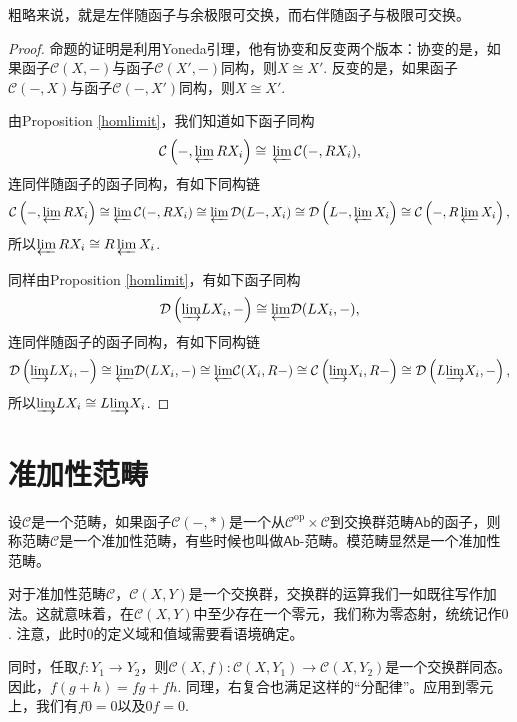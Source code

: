 	粗略来说，就是左伴随函子与余极限可交换，而右伴随函子与极限可交换。
	
\begin{proof}
	命题的证明是利用Yoneda引理，他有协变和反变两个版本：协变的是，如果函子$\mathcal{C}(X,-)$与函子$\mathcal{C}(X',-)$同构，则$X\cong X'$. 反变的是，如果函子$\mathcal{C}(-,X)$与函子$\mathcal{C}(-,X')$同构，则$X\cong X'$.
	
	由Proposition \ref{homlimit}，我们知道如下函子同构
	\[
	\mathcal{C}\left(-,{\varprojlim}\, RX_i\right)\cong \,{\varprojlim}\, \mathcal{C}(-,RX_i),
	\]
	连同伴随函子的函子同构，有如下同构链
	\[
	\mathcal{C}\left(-,{\varprojlim}\, RX_i\right)\cong {\varprojlim}\, \mathcal{C}(-,RX_i)\cong {\varprojlim}\, \mathcal{D}(L-,X_i)\cong \mathcal{D}\left(L-,{\varprojlim}\,X_i\right)\cong \mathcal{C}\left(-,R\,{\varprojlim}\, X_i\right),
	\]
	所以${\varprojlim}\, RX_i\cong R\,{\varprojlim}\, X_i$.
	
	同样由Proposition \ref{homlimit}，有如下函子同构
	\[
	\mathcal{D}\left({\varinjlim} LX_i,-\right)\cong {\varprojlim} \mathcal{D}(LX_i,-),
	\]
	连同伴随函子的函子同构，有如下同构链
	\[
	\mathcal{D}\left({\varinjlim} LX_i,-\right)\cong {\varprojlim} \mathcal{D}(LX_i,-)\cong {\varprojlim} \mathcal{C}(X_i,R-)\cong \mathcal{C}\left({\varinjlim} X_i,R-\right)\cong \mathcal{D}\left(L{\varinjlim} X_i,-\right),
	\]
	所以${\varinjlim} LX_i\cong L{\varinjlim} X_i$.
\end{proof}

\section{准加性范畴}

\begin{para}[准加性范畴]
设$\mathcal{C}$是一个范畴，如果函子$\mathcal{C}(-,*)$是一个从$\mathcal{C}^\text{op}\times \mathcal{C}$到交换群范畴$\mathsf{Ab}$的函子，则称范畴$\mathcal{C}$是一个准加性范畴，有些时候也叫做$\mathsf{Ab}$-范畴。模范畴显然是一个准加性范畴。
\end{para}

对于准加性范畴$\mathcal{C}$，$\mathcal{C}(X,Y)$是一个交换群，交换群的运算我们一如既往写作加法。这就意味着，在$\mathcal{C}(X,Y)$中至少存在一个零元，我们称为零态射，统统记作$0$. 注意，此时$0$的定义域和值域需要看语境确定。

同时，任取$f:Y_1\to Y_2$，则$\mathcal{C}(X,f):\mathcal{C}(X,Y_1)\to \mathcal{C}(X,Y_2)$是一个交换群同态。因此，$f(g+h)=fg+fh$. 同理，右复合也满足这样的“分配律”。应用到零元上，我们有$f0=0$以及$0f=0$.

